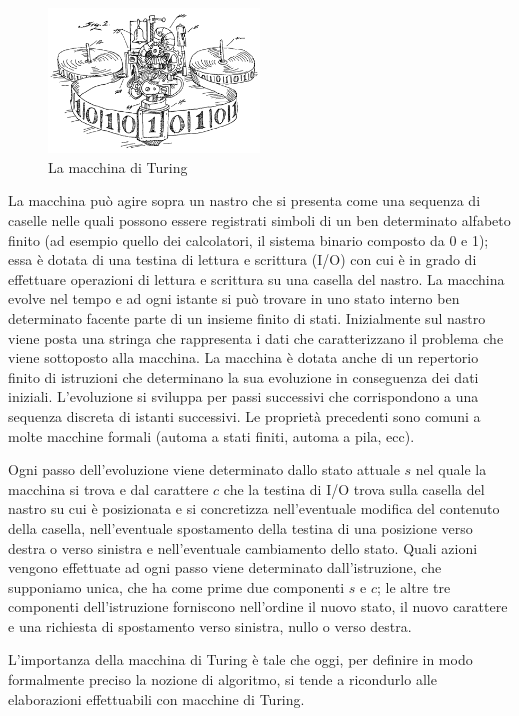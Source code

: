 \begin{figure}[hbt]
  \centering
  \includegraphics[width=0.5\textwidth]{img/turingMachine.png}
  \caption{La macchina di Turing}
\end{figure}	

La macchina può agire sopra un nastro che si presenta come una sequenza di caselle nelle quali possono essere registrati simboli di un ben determinato alfabeto finito (ad esempio quello dei calcolatori, il sistema binario composto da 0 e 1); essa è dotata di una testina di lettura e scrittura (I/O) con cui è in grado di effettuare operazioni di lettura e scrittura su una casella del nastro. La macchina evolve nel tempo e ad ogni istante si può trovare in uno stato interno ben determinato facente parte di un insieme finito di stati. Inizialmente sul nastro viene posta una stringa che rappresenta i dati che caratterizzano il problema che viene sottoposto alla macchina. La macchina è dotata anche di un repertorio finito di istruzioni che determinano la sua evoluzione in conseguenza dei dati iniziali. L'evoluzione si sviluppa per passi successivi che corrispondono a una sequenza discreta di istanti successivi. Le proprietà precedenti sono comuni a molte macchine formali (automa a stati finiti, automa a pila, ecc).

Ogni passo dell'evoluzione viene determinato dallo stato attuale $s$ nel quale la macchina si trova e dal carattere $c$ che la testina di I/O trova sulla casella del nastro su cui è posizionata e si concretizza nell'eventuale modifica del contenuto della casella, nell'eventuale spostamento della testina di una posizione verso destra o verso sinistra e nell'eventuale cambiamento dello stato. Quali azioni vengono effettuate ad ogni passo viene determinato dall'istruzione, che supponiamo unica, che ha come prime due componenti $s$ e $c$; le altre tre componenti dell'istruzione forniscono nell'ordine il nuovo stato, il nuovo carattere e una richiesta di spostamento verso sinistra, nullo o verso destra.

L'importanza della macchina di Turing è tale che oggi, per definire in modo formalmente preciso la nozione di algoritmo, si tende a ricondurlo alle elaborazioni effettuabili con macchine di Turing.

